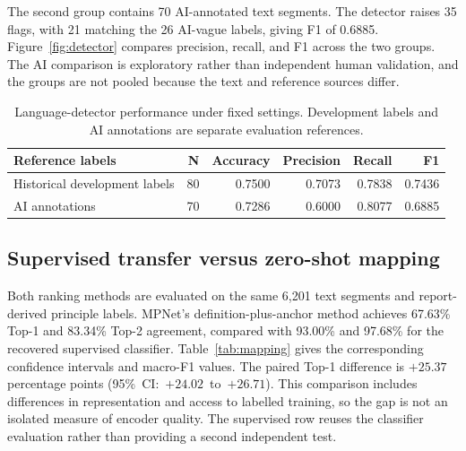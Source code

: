 The second group contains 70 AI-annotated text segments. The detector raises 35 flags, with 21 matching the 26 AI-vague labels, giving F1 of 0.6885. Figure~\ref{fig:detector} compares precision, recall, and F1 across the two groups. The AI comparison is exploratory rather than independent human validation, and the groups are not pooled because the text and reference sources differ.

\begin{table}[H]
\centering\small
\caption{Language-detector performance under fixed settings. Development labels and AI annotations are separate evaluation references.}
\label{tab:detector}
\begin{tabularx}{\linewidth}{@{}Yrrrrr@{}}
\toprule\textbf{Reference labels} & \textbf{N} & \textbf{Accuracy} & \textbf{Precision} & \textbf{Recall} & \textbf{F1}\\\midrule
Historical development labels & 80 & 0.7500 & 0.7073 & 0.7838 & 0.7436\\
AI annotations & 70 & 0.7286 & 0.6000 & 0.8077 & 0.6885\\\bottomrule
\end{tabularx}
\end{table}



\subsection{Supervised transfer versus zero-shot mapping}
\label{sec:eval_mapping}

Both ranking methods are evaluated on the same 6,201 text segments and report-derived principle labels. MPNet's definition-plus-anchor method achieves 67.63\% Top-1 and 83.34\% Top-2 agreement, compared with 93.00\% and 97.68\% for the recovered supervised classifier. Table~\ref{tab:mapping} gives the corresponding confidence intervals and macro-F1 values. The paired Top-1 difference is $+25.37$ percentage points \mbox{(95\% CI: $+24.02$ to $+26.71$)}. This comparison includes differences in representation and access to labelled training, so the gap is not an isolated measure of encoder quality. The supervised row reuses the classifier evaluation rather than providing a second independent test.

